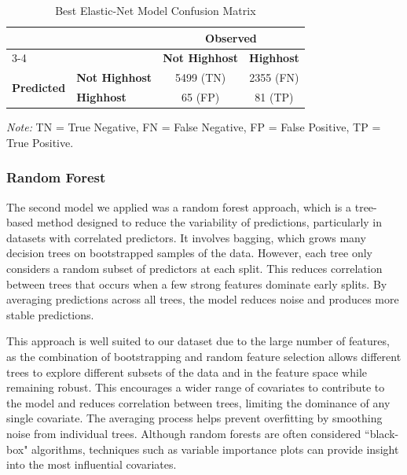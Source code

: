 \documentclass[11pt]{article}\usepackage[]{graphicx}\usepackage[]{xcolor}
\begin{document}
\begin{table}[htbp]
\centering
\caption{Best Elastic-Net Model Confusion Matrix}
\label{tab:confusion_elasticnet}
\begin{tabular}{llcc}
\toprule
& & \multicolumn{2}{c}{\textbf{Observed}} \\
\cmidrule(lr){3-4}
& & \textbf{Not Highhost} & \textbf{Highhost} \\
\midrule
\multirow{2}{*}{\textbf{Predicted}}
& \textbf{Not Highhost} & 5499 \small{(TN)} & 2355 \small{(FN)} \\[4pt]
& \textbf{Highhost}     & 65 \small{(FP)}   & 81 \small{(TP)} \\
\bottomrule
\end{tabular}
\par\smallskip
\footnotesize{\textit{Note:} TN = True Negative, FN = False Negative, FP = False Positive, TP = True Positive.}
\end{table}
\newpage
\subsubsection*{Random Forest}

The second model we applied was a random forest approach, which is a tree-based method designed to reduce the variability of predictions, particularly in datasets with correlated predictors. It involves bagging, which grows many decision trees on bootstrapped samples of the data. However, each tree only considers a random subset of predictors at each split. This reduces correlation between trees that occurs when a few strong features dominate early splits. By averaging predictions across all trees, the model reduces noise and produces more stable predictions. 

This approach is well suited to our dataset due to the large number of features, as the combination of bootstrapping and random feature selection allows different trees to explore different subsets of the data and in the feature space while remaining robust. This encourages a wider range of covariates to contribute to the model and reduces correlation between trees, limiting the dominance of any single covariate. The averaging process helps prevent overfitting by smoothing noise from individual trees. Although random forests are often considered ``black- box" algorithms, techniques such as variable importance plots can provide insight into the most influential covariates. 
\end{document}
